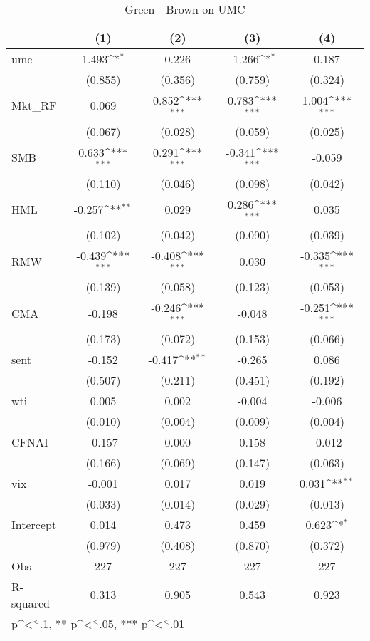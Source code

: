\begin{table}[]
\caption{Green - Brown on UMC}
\label{tab: on_umc}
{
\def\sym#1{\ifmmode^{#1}\else\(^{#1}\)\fi}
\begin{tabular}{@{\extracolsep{2pt}}l*{4}{c}@{}}
\hline\hline


 & (1) & (2) & (3) & (4) \\
\hline
umc & 1.493\sym{*} & 0.226 & -1.266\sym{*} & 0.187 \\
 & (0.855) & (0.356) & (0.759) & (0.324) \\
Mkt\_RF & 0.069 & 0.852\sym{***} & 0.783\sym{***} & 1.004\sym{***} \\
 & (0.067) & (0.028) & (0.059) & (0.025) \\
SMB & 0.633\sym{***} & 0.291\sym{***} & -0.341\sym{***} & -0.059 \\
 & (0.110) & (0.046) & (0.098) & (0.042) \\
HML & -0.257\sym{**} & 0.029 & 0.286\sym{***} & 0.035 \\
 & (0.102) & (0.042) & (0.090) & (0.039) \\
RMW & -0.439\sym{***} & -0.408\sym{***} & 0.030 & -0.335\sym{***} \\
 & (0.139) & (0.058) & (0.123) & (0.053) \\
CMA & -0.198 & -0.246\sym{***} & -0.048 & -0.251\sym{***} \\
 & (0.173) & (0.072) & (0.153) & (0.066) \\
sent & -0.152 & -0.417\sym{**} & -0.265 & 0.086 \\
 & (0.507) & (0.211) & (0.451) & (0.192) \\
wti & 0.005 & 0.002 & -0.004 & -0.006 \\
 & (0.010) & (0.004) & (0.009) & (0.004) \\
CFNAI & -0.157 & 0.000 & 0.158 & -0.012 \\
 & (0.166) & (0.069) & (0.147) & (0.063) \\
vix & -0.001 & 0.017 & 0.019 & 0.031\sym{**} \\
 & (0.033) & (0.014) & (0.029) & (0.013) \\
Intercept & 0.014 & 0.473 & 0.459 & 0.623\sym{*} \\
 & (0.979) & (0.408) & (0.870) & (0.372) \\

\hline
Obs & 227 & 227 & 227 & 227 \\
R-squared & 0.313 & 0.905 & 0.543 & 0.923 \\
\hline\hline
\multicolumn{5}{l}{\footnotesize * p\sym{<}.1, ** p\sym{<}.05, *** p\sym{<}.01}
\end{tabular}
}
\end{table}
